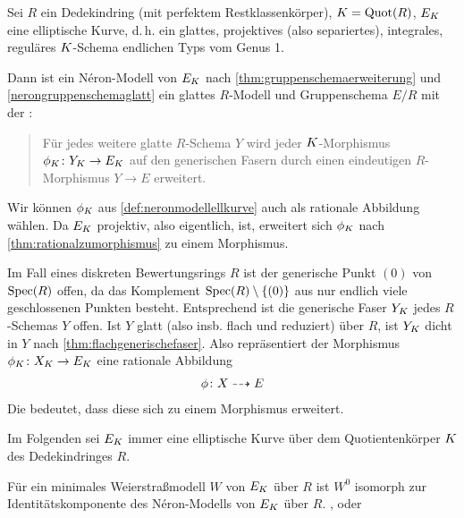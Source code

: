 \documentclass[german]{scrreprt}
\begin{document}
\begin{Bemerkung}
  \label{def:neronmodellellkurve}
  Sei $R$ ein Dedekindring (mit perfektem Restklassenkörper),
  $K=\operatorname{Quot}(R)$, $E_{K}$ eine elliptische Kurve, d.\,h. ein
  glattes, projektives (also separiertes), integrales, reguläres
  $K$-Schema endlichen Typs vom Genus 1.
  
  Dann ist ein Néron-Modell von $E_{K}$ nach
  \ref{thm:gruppenschemaerweiterung} und \ref{nerongruppenschemaglatt}
  ein glattes $R$-Modell und Gruppenschema $E/R$ mit der
  \NAbbEig:
  \begin{quote}
    Für jedes weitere glatte $R$-Schema $Y$ wird jeder
    $K$-Morphismus $\phi_{K}\colon Y_{K}\to E_{K}$ auf den generischen
    Fasern durch einen eindeutigen $R$-Morphismus $Y\to E$ erweitert.
  \end{quote}
  \cite[Chapter IV.5]{silverman2}
\end{Bemerkung}
\begin{Bemerkung}\label{thm:dichtefaser}
  Wir können $\phi_{K}$ aus \autoref{def:neronmodellellkurve} auch als
  rationale Abbildung wählen. Da $E_{K}$ projektiv, also eigentlich,
  ist, erweitert sich $\phi_{K}$ nach
  \autoref{thm:rationalzumorphismus} zu einem Morphismus.

  Im Fall eines diskreten Bewertungsrings $R$ ist der generische Punkt
  $(0)$ von $\operatorname{Spec}(R)$ offen, da das Komplement
  $\operatorname{Spec}(R)\setminus\{(0)\}$ aus nur endlich viele geschlossenen
  Punkten besteht. Entsprechend ist die generische Faser $Y_{K}$ jedes
  $R$-Schemas $Y$ offen.
  Ist $Y$ glatt (also insb. flach und reduziert) über $R$, ist $Y_{K}$
  dicht in $Y$ nach \autoref{thm:flachgenerischefaser}.
  Also repräsentiert der Morphismus $\phi_{K}\colon X_{K}\to E_{K}$ eine
  rationale Abbildung
  \begin{gather*}
    \phi\colon X\dashrightarrow E
  \end{gather*}
  Die \NAbbEig bedeutet, dass diese sich zu einem Morphismus erweitert.
\end{Bemerkung}

Im Folgenden sei $E_{K}$ immer eine elliptische Kurve über dem
Quotientenkörper $K$ des Dedekindringes $R$.

\begin{Bemerkung}
  Für ein minimales Weierstraßmodell $W$ von $E_{K}$ über $R$
  ist $W^0$ isomorph zur Identitätskomponente des Néron-Modells von
  $E_{K}$ über $R$.
  \cite[Corollary IV.9.1]{silverman2},
  \cite[Chapter 1.5, S.\,23]{neron} oder
  \cite[S. 46]{tate}
\end{Bemerkung}
\end{document}
